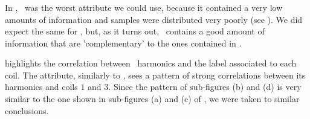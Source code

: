 \subsubsection{\bn}
In \qrp, \bn\ was the worst attribute we could use, because it contained a very low amounts of
information and samples were distributed very poorly (see ). We did expect the
same for \qlp, but, as it turns out, \bn\ contains a good amount of information that are
'complementary' to the ones contained in \an.

 highlights the correlation between \bn\ harmonics and the label associated
to each coil. The attribute, similarly to \an, sees a pattern of strong correlations between its
harmonics and coils $1$ and $3$. Since the pattern of sub-figures (b) and (d) is very similar to the
one shown in sub-figures (a) and (c) of , we were taken to similar
conclusions.
